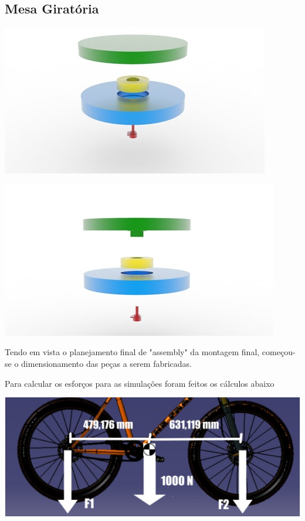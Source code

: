 \subsection{Mesa Giratória}

    \begin{center}
    	\includegraphics[scale=0.7]{figuras/acoplamento_frontal}
        \label{acoplamento_frontal}
    \end{center}
    
    \begin{center}
    	\includegraphics[scale=0.7]{figuras/acoplamento_frontal_2}
        \label{acoplamento_frontal_2}
    \end{center}


    Tendo em vista o planejamento final de "assembly" da montagem final, começou-se o dimensionamento das peças a serem fabricadas.

    Para calcular os esforços para as simulações foram feitos os cálculos abaixo

    \begin{center}
    	\includegraphics[scale=0.7]{figuras/analise_corpos_livres}
        \label{analise_corpos_livres}
    \end{center}


